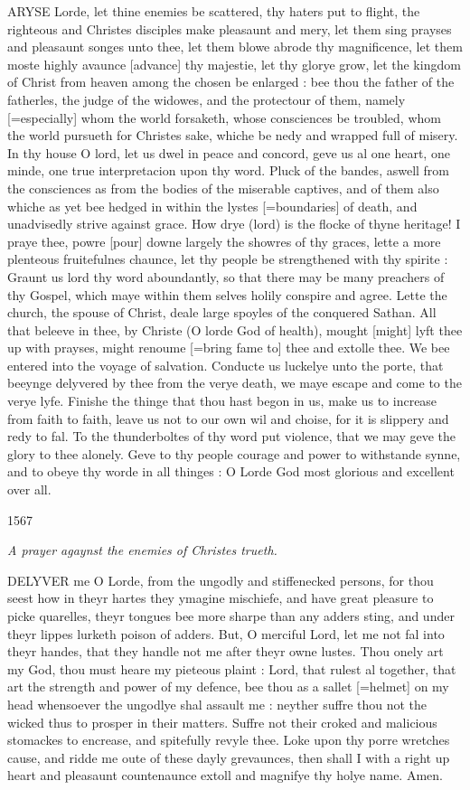 ARYSE
Lorde, let thine enemies be scattered, thy haters put to flight, the righteous
and Christes disciples make pleasaunt and mery, let them sing prayses
and pleasaunt songes unto thee, let them blowe abrode thy magnificence,
let them moste highly avaunce [advance]
thy majestie, let thy glorye grow, let the kingdom of Christ from heaven
among the chosen be enlarged : bee thou the father of the fatherles, the
judge of the widowes, and the protectour of them, namely [=especially]
whom the world forsaketh, whose consciences be troubled, whom the world
pursueth for Christes sake, whiche be nedy and wrapped full of misery.
In thy house O lord, let us dwel in peace and concord, geve us al one
heart, one minde, one true interpretacion upon thy word. Pluck of the
bandes, aswell from the consciences as from the bodies of the miserable
captives, and of them also whiche as yet bee hedged in within the lystes
[=boundaries]
of death, and unadvisedly strive against grace. How drye (lord) is the
flocke of thyne heritage! I praye thee, powre [pour]
downe largely the showres of thy graces, lette a more plenteous fruitefulnes
chaunce, let thy people be strengthened with thy spirite : Graunt us lord
thy word aboundantly, so that there may be many preachers of thy Gospel,
which maye within them selves holily conspire and agree. Lette the church,
the spouse of Christ, deale large spoyles of the conquered Sathan. All
that beleeve in thee, by Christe (O lorde God of health), mought [might]
lyft thee up with prayses, might renoume [=bring
fame to] thee and extolle thee. We bee entered into the voyage
of salvation. Conducte us luckelye unto the porte, that beeynge delyvered
by thee from the verye death, we maye escape and come to the verye lyfe.
Finishe the thinge that thou hast begon in us, make us to increase from
faith to faith, leave us not to our own wil and choise, for it is slippery
and redy to fal. To the thunderboltes of thy word put violence, that we
may geve the glory to thee alonely. Geve to thy people courage and power
to withstande synne, and to obeye thy worde in all thinges : O Lorde God
most glorious and excellent over all.

1567

\emph{A
prayer agaynst the enemies of Christes trueth.}

DELYVER
me O Lorde, from the ungodly and stiffenecked persons, for thou seest
how in theyr hartes they ymagine mischiefe, and have great pleasure to
picke quarelles, theyr tongues bee more sharpe than any adders sting,
and under theyr lippes lurketh poison of adders. But, O merciful Lord,
let me not fal into theyr handes, that they handle not me after theyr
owne lustes. Thou onely art my God, thou must heare my pieteous plaint
: Lord, that rulest al together, that art the strength and power of my
defence, bee thou as a sallet [=helmet]
on my head whensoever the ungodlye shal assault me : neyther suffre thou
not the wicked thus to prosper in their matters. Suffre not their croked
and malicious stomackes to encrease, and spitefully revyle thee. Loke
upon thy porre wretches cause, and ridde me oute of these dayly grevaunces,
then shall I with a right up heart and pleasaunt countenaunce extoll and
magnifye thy holye name. Amen.

